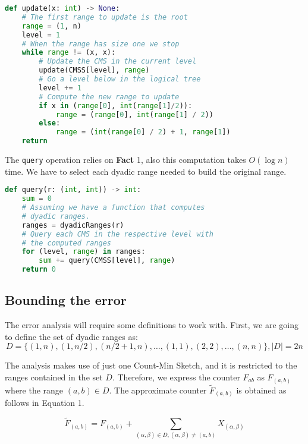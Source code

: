 \documentclass{article}
\begin{document}
\begin{lstlisting}[language=python]
def update(x: int) -> None:
    # The first range to update is the root
    range = (1, n)
    level = 1
    # When the range has size one we stop
    while range != (x, x):
        # Update the CMS in the current level
        update(CMSS[level], range) 
        # Go a level below in the logical tree
        level += 1 
        # Compute the new range to update
        if x in (range[0], int(range[1]/2)):
            range = (range[0], int(range[1] / 2))
        else:
            range = (int(range[0] / 2) + 1, range[1])
    return
\end{lstlisting}

\noindent The \verb+query+ operation relies on \textbf{Fact} 1, also this computation takes $O(\log n)$ time. 
We have to select each dyadic range needed to build the original range.

\begin{lstlisting}[language=python]
def query(r: (int, int)) -> int:
    sum = 0
    # Assuming we have a function that computes
    # dyadic ranges.
    ranges = dyadicRanges(r)
    # Query each CMS in the respective level with
    # the computed ranges
    for (level, range) in ranges:
        sum += query(CMSS[level], range)
    return 0
\end{lstlisting}

\subsection{Bounding the error}

The error analysis will require some definitions to work with. First, we are going to define the set of dyadic ranges as:
\begin{equation*}
    D = \{(1, n), (1, {n}/{2}), ({n}/{2} + 1, n), \dots, (1, 1), (2, 2), \dots, (n, n)\}, |D| = 2n
\end{equation*}

\noindent The analysis makes use of just one Count-Min Sketch, and it is restricted to the ranges contained in the set $D$. Therefore,
we express the counter $F_{ab}$ as $F_{(a, b)}$ where the range $(a, b) \in D$. The approximate counter $\tilde{F}_{(a, b)}$ is obtained
as follows in Equation 1.

\begin{equation}
    \tilde{F}_{(a, b)} = F_{(a, b)} + \sum_{(\alpha, \beta) \in D,(\alpha, \beta) \ne (a, b)} X_{(\alpha, \beta)}
\end{equation}
\end{document}
